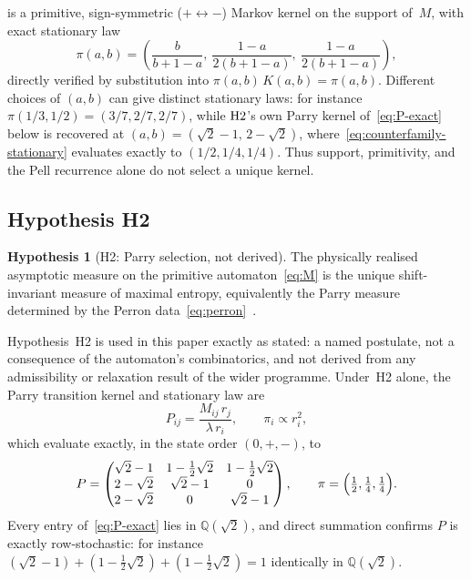 \documentclass[11pt,a4paper]{article}
\theoremstyle{definition}
\newtheorem{hypothesis}[theorem]{Hypothesis}
\theoremstyle{remark}
\newcommand{\Q}{\mathbb{Q}}
\newcommand{\Qroot}{\Q(\sqrt{2})}
\begin{document}
is a primitive, sign-symmetric ($+\leftrightarrow-$) Markov kernel on the support
of~$M$, with exact stationary law
\begin{equation}
  \label{eq:counterfamily-stationary}
  \pi(a,b) = \left(\frac{b}{b+1-a},\ \frac{1-a}{2(b+1-a)},\ \frac{1-a}{2(b+1-a)}\right),
\end{equation}
directly verified by substitution into $\pi(a,b)\,K(a,b)=\pi(a,b)$. Different choices
of $(a,b)$ can give distinct stationary laws: for instance $\pi(1/3,1/2)=(3/7,2/7,2/7)$, while $\textup{H2}$'s
own Parry kernel of~\eqref{eq:P-exact} below is recovered at $(a,b)=(\sqrt2-1,\,2-\sqrt2)$,
where~\eqref{eq:counterfamily-stationary} evaluates exactly to $(1/2,1/4,1/4)$. Thus
support, primitivity, and the Pell recurrence alone do not select a unique kernel.

\subsection{Hypothesis \textup{H2}}
\label{sec:h2-hyp}

\begin{hypothesis}[\textup{H2}: Parry selection, not derived]
  \label{hyp:h2}
  The physically realised asymptotic measure on the primitive automaton~\eqref{eq:M} is
  the unique shift-invariant measure of maximal entropy, equivalently the Parry measure
  determined by the Perron data~\eqref{eq:perron}~\cite{Parry1964}.
\end{hypothesis}

Hypothesis~\textup{H2} is used in this paper exactly as stated: a named postulate, not a
consequence of the automaton's combinatorics, and not derived from any admissibility or
relaxation result of the wider programme. Under~\textup{H2} alone, the Parry transition
kernel and stationary law are
\begin{equation}
  \label{eq:parry-kernel}
  P_{ij} = \frac{M_{ij}\,r_j}{\lambda\, r_i}, \qquad
  \pi_i \propto r_i^2 ,
\end{equation}
which evaluate exactly, in the state order $(0,+,-)$, to
\begin{equation}
  \label{eq:P-exact}
  P = \begin{pmatrix}
    \sqrt2-1 & 1-\tfrac12\sqrt2 & 1-\tfrac12\sqrt2 \\
    2-\sqrt2 & \sqrt2-1 & 0 \\
    2-\sqrt2 & 0 & \sqrt2-1
  \end{pmatrix},
  \qquad
  \pi = \Bigl(\tfrac12,\tfrac14,\tfrac14\Bigr).
\end{equation}
Every entry of~\eqref{eq:P-exact} lies in $\Qroot$, and direct summation confirms $P$ is
exactly row-stochastic: for instance
$(\sqrt2-1)+(1-\tfrac12\sqrt2)+(1-\tfrac12\sqrt2) = 1$ identically in $\Qroot$.
\end{document}
